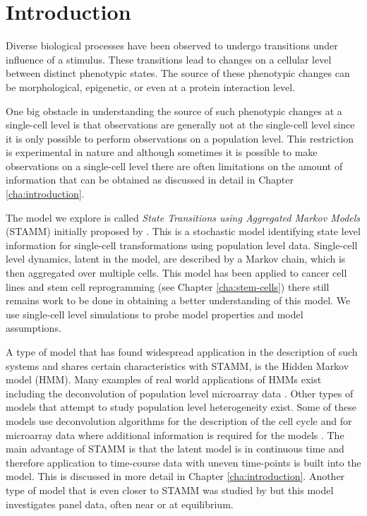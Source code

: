 
\section{Introduction}
\label{sec:intro-stamm}

Diverse biological processes have been observed to undergo transitions under influence of a stimulus. These transitions lead to changes on a cellular level between distinct phenotypic states. The source of these phenotypic changes can be morphological, epigenetic, or even at a protein interaction level.

One big obstacle in understanding the source of such phenotypic changes at a single-cell level is that observations are generally not at the single-cell level since it is only possible to perform observations on a population level. This restriction is experimental in nature and although sometimes it is possible to make observations on a single-cell level there are often limitations on the amount of information that can be obtained as discussed in detail in Chapter \ref{cha:introduction}.

The model we explore is called \emph{State Transitions using Aggregated Markov Models} (STAMM) initially proposed by \cite{Armond:2013}. This is a stochastic model identifying  state level information for single-cell transformations using population level data. Single-cell level dynamics, latent in the model, are described by a Markov chain, which is then aggregated over multiple cells. This model has been applied to cancer cell lines  \citep{Casale:2013} and stem cell reprogramming (see Chapter \ref{cha:stem-cells}) there still remains work to be done in obtaining a better understanding of this model. We use single-cell level simulations to probe model properties and model assumptions.

A type of model that has found widespread application in the description of such systems and shares certain characteristics with STAMM, is the Hidden Markov model (HMM). Many examples of real world applications of HMMs exist including the deconvolution of population level microarray data \citep{Roy:2006ik}. Other types of models that attempt to study population level heterogeneity exist. Some of these models use deconvolution algorithms for the description of the cell cycle and for microarray data where additional information is required for the models \citep{Bar-Joseph04082004, BarJoseph:2008bx}. The main advantage of STAMM is that the latent model is in continuous time and therefore application to time-course data with uneven time-points is built into the model. This is discussed in more detail in Chapter \ref{cha:introduction}. Another type of model that is even closer to STAMM was studied by \cite{Kalbfleisch:1983vd} but this model investigates panel data, often near or at equilibrium.

